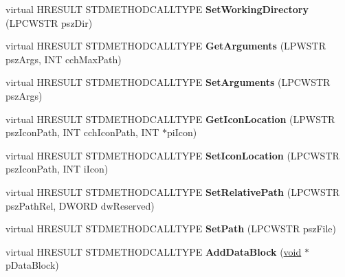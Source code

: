 \begin{DoxyCompactItemize}
\mbox{\label{class_c_shell_link_a72f526c2aa76bd146ce8cc8db0297f73}} 
virtual H\+R\+E\+S\+U\+LT S\+T\+D\+M\+E\+T\+H\+O\+D\+C\+A\+L\+L\+T\+Y\+PE {\bfseries Set\+Working\+Directory} (L\+P\+C\+W\+S\+TR psz\+Dir)
\item 
\mbox{\label{class_c_shell_link_abebf179f65f125c169c2fd6a36a92d8a}} 
virtual H\+R\+E\+S\+U\+LT S\+T\+D\+M\+E\+T\+H\+O\+D\+C\+A\+L\+L\+T\+Y\+PE {\bfseries Get\+Arguments} (L\+P\+W\+S\+TR psz\+Args, I\+NT cch\+Max\+Path)
\item 
\mbox{\label{class_c_shell_link_a2179563e44b175560a5ca2aa9c71369d}} 
virtual H\+R\+E\+S\+U\+LT S\+T\+D\+M\+E\+T\+H\+O\+D\+C\+A\+L\+L\+T\+Y\+PE {\bfseries Set\+Arguments} (L\+P\+C\+W\+S\+TR psz\+Args)
\item 
\mbox{\label{class_c_shell_link_a3fbd8aab1fb9f1bc4b738e1b05c85cd8}} 
virtual H\+R\+E\+S\+U\+LT S\+T\+D\+M\+E\+T\+H\+O\+D\+C\+A\+L\+L\+T\+Y\+PE {\bfseries Get\+Icon\+Location} (L\+P\+W\+S\+TR psz\+Icon\+Path, I\+NT cch\+Icon\+Path, I\+NT $\ast$pi\+Icon)
\item 
\mbox{\label{class_c_shell_link_a25beafada10adff62656761b58217e84}} 
virtual H\+R\+E\+S\+U\+LT S\+T\+D\+M\+E\+T\+H\+O\+D\+C\+A\+L\+L\+T\+Y\+PE {\bfseries Set\+Icon\+Location} (L\+P\+C\+W\+S\+TR psz\+Icon\+Path, I\+NT i\+Icon)
\item 
\mbox{\label{class_c_shell_link_a50d69f1c1449a636306e1841eea6114c}} 
virtual H\+R\+E\+S\+U\+LT S\+T\+D\+M\+E\+T\+H\+O\+D\+C\+A\+L\+L\+T\+Y\+PE {\bfseries Set\+Relative\+Path} (L\+P\+C\+W\+S\+TR psz\+Path\+Rel, D\+W\+O\+RD dw\+Reserved)
\item 
\mbox{\label{class_c_shell_link_abd34f125cdda3bab97afc96e81791c05}} 
virtual H\+R\+E\+S\+U\+LT S\+T\+D\+M\+E\+T\+H\+O\+D\+C\+A\+L\+L\+T\+Y\+PE {\bfseries Set\+Path} (L\+P\+C\+W\+S\+TR psz\+File)
\item 
\mbox{\label{class_c_shell_link_a5cf93cfa85a17a5cbef0d2e610df0d44}} 
virtual H\+R\+E\+S\+U\+LT S\+T\+D\+M\+E\+T\+H\+O\+D\+C\+A\+L\+L\+T\+Y\+PE {\bfseries Add\+Data\+Block} (\hyperlink{interfacevoid}{void} $\ast$p\+Data\+Block)

\end{DoxyCompactItemize}
